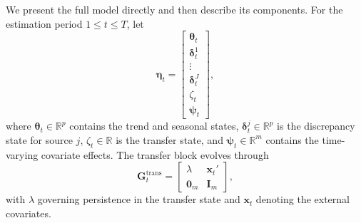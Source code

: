 \documentclass[APA,STIX1COL]{WileyNJD-v2}
\begin{document}
We present the full model directly and then describe its components. For the estimation period \(1 \leq t \leq T\), let
\[
\boldsymbol{\eta}_t =
\begin{bmatrix}
\boldsymbol{\theta}_t \\
\boldsymbol{\delta}_t^1 \\
\vdots \\
\boldsymbol{\delta}_t^J \\
\zeta_t \\
\boldsymbol{\psi}_t
\end{bmatrix},
\]
where \(\boldsymbol{\theta}_t \in \mathbb{R}^p\) contains the trend and seasonal states, \(\boldsymbol{\delta}_t^j \in \mathbb{R}^p\) is the discrepancy state for source \(j\), \(\zeta_t \in \mathbb{R}\) is the transfer state, and \(\boldsymbol{\psi}_t \in \mathbb{R}^m\) contains the time-varying covariate effects. The transfer block evolves through
\[
\mathbf{G}^{\text{trans}}_t =
\begin{bmatrix}
\lambda & \mathbf{x}_t' \\
\mathbf{0}_m & \mathbf{I}_m
\end{bmatrix},
\]
with \(\lambda\) governing persistence in the transfer state and \(\mathbf{x}_t\) denoting the external covariates.
\end{document}
